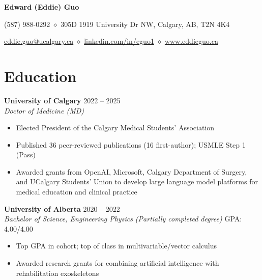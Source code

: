 \documentclass{article}
\begin{document}
\pagestyle{plain}
\begin{center}
\LARGE \textbf{\textcolor{my_colour}{Edward (Eddie) Guo}} \vspace{.2em}

\normalfont \normalsize
(587) 988-0292 \hspace{.15em} $\diamond$ \hspace{.15em} 305D 1919 University Dr NW, Calgary, AB, T2N 4K4

\href{mailto:eddie.guo@ucalgary.ca}{eddie.guo@ucalgary.ca}
    \hspace{.15em} $\diamond$ \hspace{.15em}
\href{https://www.linkedin.com/in/eguo1}{linkedin.com/in/eguo1}
    \hspace{.15em} $\diamond$ \hspace{.15em}
\href{https://eddieguo.ca}{www.eddieguo.ca}
\end{center}

\vspace{-1em}


\section*{\textcolor{my_colour}{Education}}
\vspace{-.25em} \hrulefill \vspace{.25em}

\textbf{University of Calgary} \hfill 2022 -- 2025 \\
\textit{Doctor of Medicine (MD)}
\begin{itemize}
    \item Elected President of the Calgary Medical Students' Association
    \item Published 36 peer-reviewed publications (16 first-author); USMLE Step 1 (Pass)
    \item Awarded grants from OpenAI, Microsoft, Calgary Department of Surgery, and UCalgary Students' Union to develop large language model platforms for medical education and clinical practice
\end{itemize} \vspace{1em}

\textbf{University of Alberta} \hfill 2020 -- 2022 \\
\textit{Bachelor of Science, Engineering Physics (Partially completed degree)} \hfill GPA: 4.00/4.00
\begin{itemize}
    \item Top GPA in cohort; top of class in multivariable/vector calculus
    \item Awarded research grants for combining artificial intelligence with rehabilitation exoskeletons
\end{itemize} \vspace{1em}
\end{document}

